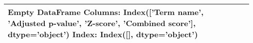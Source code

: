 \begin{tabular}{llll}
\toprule
Empty DataFrame
Columns: Index(['Term name', 'Adjusted p-value', 'Z-score', 'Combined score'], dtype='object')
Index: Index([], dtype='object') \\
\bottomrule
\end{tabular}
